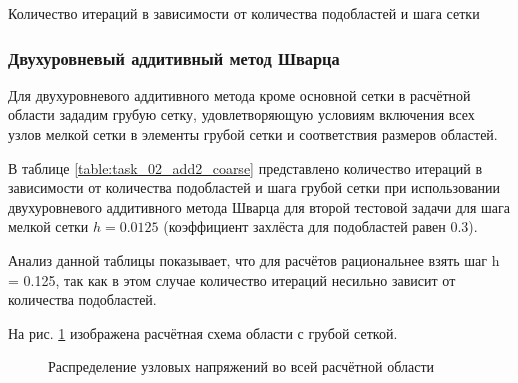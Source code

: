 \documentclass[a4paper]{article}
\begin{document}
\begin{table}[h]
\caption{Количество итераций в зависимости от количества подобластей и шага сетки}
\label{table:task_02_add_iters}
\end{table}

\newpage

\subsubsection{Двухуровневый аддитивный метод Шварца}

Для двухуровневого аддитивного метода кроме основной сетки в расчётной области зададим грубую сетку, удовлетворяющую условиям включения всех узлов мелкой сетки в элементы грубой сетки и соответствия размеров областей. 

В таблице \ref{table:task_02_add2_coarse} представлено количество итераций в зависимости от количества подобластей и шага грубой сетки при использовании двухуровневого аддитивного метода Шварца для второй тестовой задачи для шага мелкой сетки $h = 0.0125$ (коэффициент захлёста для подобластей равен 0.3).

Анализ данной таблицы показывает, что для расчётов рациональнее взять шаг h = 0.125, так как в этом случае количество итераций несильно зависит от количества подобластей.

На рис. \ref{fig:task_02_area_coarse} изображена расчётная схема области с грубой сеткой.

\begin{figure}[h]
\caption{Распределение узловых напряжений во всей расчётной области}
\label{fig:task_02_area_coarse}
\end{figure}
\end{document}

